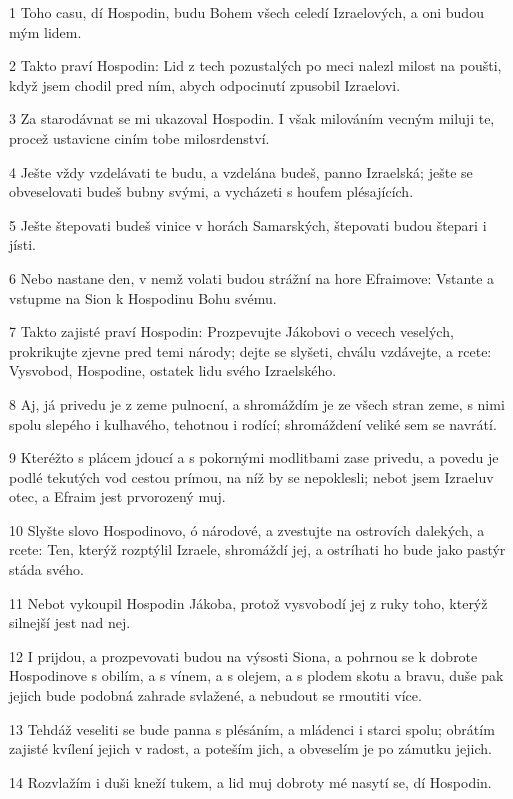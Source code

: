 \par 1 Toho casu, dí Hospodin, budu Bohem všech celedí Izraelových, a oni budou mým lidem.
\par 2 Takto praví Hospodin: Lid z tech pozustalých po meci nalezl milost na poušti, když jsem chodil pred ním, abych odpocinutí zpusobil Izraelovi.
\par 3 Za starodávnat se mi ukazoval Hospodin. I však milováním vecným miluji te, procež ustavicne ciním tobe milosrdenství.
\par 4 Ješte vždy vzdelávati te budu, a vzdelána budeš, panno Izraelská; ješte se obveselovati budeš bubny svými, a vycházeti s houfem plésajících.
\par 5 Ješte štepovati budeš vinice v horách Samarských, štepovati budou štepari i jísti.
\par 6 Nebo nastane den, v nemž volati budou strážní na hore Efraimove: Vstante a vstupme na Sion k Hospodinu Bohu svému.
\par 7 Takto zajisté praví Hospodin: Prozpevujte Jákobovi o vecech veselých, prokrikujte zjevne pred temi národy; dejte se slyšeti, chválu vzdávejte, a rcete: Vysvobod, Hospodine, ostatek lidu svého Izraelského.
\par 8 Aj, já privedu je z zeme pulnocní, a shromáždím je ze všech stran zeme, s nimi spolu slepého i kulhavého, tehotnou i rodící; shromáždení veliké sem se navrátí.
\par 9 Kteréžto s plácem jdoucí a s pokornými modlitbami zase privedu, a povedu je podlé tekutých vod cestou prímou, na níž by se nepoklesli; nebot jsem Izraeluv otec, a Efraim jest prvorozený muj.
\par 10 Slyšte slovo Hospodinovo, ó národové, a zvestujte na ostrovích dalekých, a rcete: Ten, kterýž rozptýlil Izraele, shromáždí jej, a ostríhati ho bude jako pastýr stáda svého.
\par 11 Nebot vykoupil Hospodin Jákoba, protož vysvobodí jej z ruky toho, kterýž silnejší jest nad nej.
\par 12 I prijdou, a prozpevovati budou na výsosti Siona, a pohrnou se k dobrote Hospodinove s obilím, a s vínem, a s olejem, a s plodem skotu a bravu, duše pak jejich bude podobná zahrade svlažené, a nebudout se rmoutiti více.
\par 13 Tehdáž veseliti se bude panna s plésáním, a mládenci i starci spolu; obrátím zajisté kvílení jejich v radost, a poteším jich, a obveselím je po zámutku jejich.
\par 14 Rozvlažím i duši kneží tukem, a lid muj dobroty mé nasytí se, dí Hospodin.

